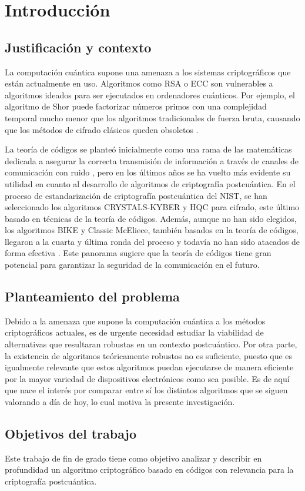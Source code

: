 \newpage{\pagestyle{empty}}
\chapter{Introducción}

\section{Justificación y contexto}

La computación cuántica supone una amenaza a los sistemas criptográficos que están actualmente en uso. Algoritmos como RSA o ECC son vulnerables a algoritmos ideados para ser ejecutados en ordenadores cuánticos. Por ejemplo, el algoritmo de Shor puede factorizar números primos con una complejidad temporal mucho menor que los algoritmos tradicionales de fuerza bruta, causando que los métodos de cifrado clásicos queden obsoletos \autocite{Shor_1997}.

La teoría de códigos se planteó inicialmente como una rama de las matemáticas dedicada a asegurar la correcta transmisión de información a través de canales de comunicación con ruido \autocite{6772729}, pero en los últimos años se ha vuelto más evidente su utilidad en cuanto al desarrollo de algoritmos de criptografía postcuántica. En el proceso de estandarización de criptografía postcuántica del NIST, se han seleccionado los algoritmos CRYSTALS-KYBER y HQC para cifrado, este último basado en técnicas de la teoría de códigos. Además, aunque no han sido elegidos, los algoritmos BIKE y Classic McEliece, también basados en la teoría de códigos, llegaron a la cuarta y última ronda del proceso y todavía no han sido atacados de forma efectiva \autocite{NIST8545}. Este panorama sugiere que la teoría de códigos tiene gran potencial para garantizar la seguridad de la comunicación en el futuro.

\section{Planteamiento del problema}

Debido a la amenaza que supone la computación cuántica a los métodos criptográficos actuales, es de urgente necesidad estudiar la viabilidad de alternativas que resultaran robustas en un contexto postcuántico. Por otra parte, la existencia de algoritmos teóricamente robustos no es suficiente, puesto que es igualmente relevante que estos algoritmos puedan ejecutarse de manera eficiente por la mayor variedad de dispositivos electrónicos como sea posible. Es de aquí que nace el interés por comparar entre sí los distintos algoritmos que se siguen valorando a día de hoy, lo cual motiva la presente investigación.

\section{Objetivos del trabajo}

Este trabajo de fin de grado tiene como objetivo analizar y describir en profundidad un algoritmo criptográfico basado en códigos con relevancia para la criptografía postcuántica.
